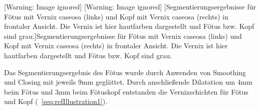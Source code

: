 \begin{center}
 [Warning: Image ignored] %
 [Warning: Image ignored] %
[Segmentierungsergebnisse für Fötus mit Vernix caseosa
(links) und Kopf mit Vernix caseosa (rechts) in frontaler Ansicht. Die
Vernix ist hier hautfarben dargestellt und Fötus bzw. Kopf sind
grau.]{Segmentierungsergebnisse für Fötus mit Vernix caseosa (links)
und Kopf mit Vernix caseosa (rechts) in frontaler Ansicht. Die Vernix
ist hier hautfarben dargestellt und Fötus bzw. Kopf sind grau.}
\label{seq:refIllustration1}

\end{center}
Das Segmentierungsergebnis des Fötus wurde durch Anwenden von Smoothing
und Closing mit jeweils 9mm geglättet. Durch anschließende Dilatation
um 4mm beim Fötus und 3mm beim Fötuskopf entstanden die Vernixschichten
für Fötus und Kopf (\figurename~\ref{seq:refIllustration1}). 



